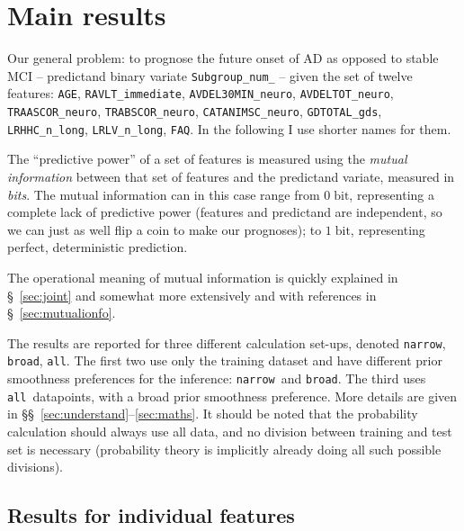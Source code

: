 \documentclass[\ifafour a4paper,12pt,\else a5paper,10pt,\fi%
onecolumn,oneside,article,%
british%
]{memoir}
\theoremstyle{remark}
\theoremstyle{innote}
\renewcommand*{\|}[1][]{\nonscript\:#1\vert\nonscript\:\mathopen{}}
\newcommand*{\sect}{\S}%
\newcommand*{\sects}{\S\S}%
\newcommand*{\bit}{\textrm{bit}}
\newcommand*{\narrow}{\texttt{narrow}}
\newcommand*{\broad}{\texttt{broad}}
\newcommand*{\all}{\texttt{all}}
\begin{document}
\section{Main results}
\label{sec:main_res}

Our general problem: to prognose the future onset of AD as opposed to
stable MCI -- predictand binary variate \texttt{Subgroup\_num\_} -- given
the set of twelve features: \texttt{AGE}, \texttt{RAVLT\_immediate},
\texttt{AVDEL30MIN\_neuro}, \texttt{AVDELTOT\_neuro},
\texttt{TRAASCOR\_neuro}, \texttt{TRABSCOR\_neuro},
\texttt{CATANIMSC\_neuro}, \texttt{GDTOTAL\_gds}, \texttt{LRHHC\_n\_long},
\texttt{LRLV\_n\_long}, \texttt{FAQ}. In the following I use shorter names
for them.

The \enquote{predictive power} of a set of features is measured using the
\emph{mutual information} between that set of features and the predictand
variate, measured in \emph{bits}. The mutual information can in this case
range from $0\;\bit$, representing a complete lack of predictive power
(features and predictand are independent, so we can just as well flip a
coin to make our prognoses); to $1\;\bit$, representing perfect,
deterministic prediction.

The operational meaning of mutual
information is quickly explained in \sect~\ref{sec:joint} and somewhat
more extensively and with references in \sect~\ref{sec:mutualionfo}.

The results are reported for three different calculation set-ups, denoted
\narrow, \broad, \all. The first two use only the training dataset and have
different prior smoothness preferences for the inference: \narrow\ and
\broad. The third uses \all\ datapoints, with a broad prior smoothness
preference. More details are given in
\sects~\ref{sec:understand}--\ref{sec:maths}. It should be noted that the
probability calculation should always use all data, and no division between
training and test set is necessary (probability theory is implicitly
already doing all such possible divisions).


\subsection{Results for individual features}
\label{sec:indiv_features}
\end{document}
